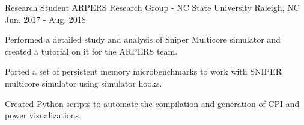 \par\addvspace{1ex}


\begin{cventries}

  \cventry
    {Research Student} %
    {ARPERS Research Group - NC State University} %
    {Raleigh, NC} %
    {\color{darkgray}Jun. 2017 - Aug. 2018} %
    {
      \begin{cvitems} %
        \item {Performed a detailed study and analysis of Sniper Multicore simulator and created a tutorial on it for the ARPERS team. }
        \item {Ported a set of persistent memory microbenchmarks to work with SNIPER multicore simulator using simulator hooks.}
        \item {Created Python scripts to automate the compilation and generation of CPI and power visualizations. }
      \end{cvitems}
    }



\end{cventries}

